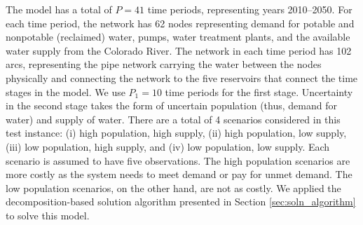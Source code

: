 \documentclass[11pt]{article}
\newcommand{\x}{\mathbf{x}}
\newcommand{\y}{\mathbf{y}}
\renewcommand{\c}{\mathbf{c}}
\newcommand{\q}{\mathbf{q}}
\renewcommand{\b}{\mathbf{b}}
\renewcommand{\d}{\mathbf{d}}
\newcommand{\plp}{$\phi$LP-2}
\begin{document}


The model has a total of $P = 41$ time periods, representing years 2010--2050. 
For each time period, the network has 62 nodes representing demand for potable and nonpotable (reclaimed) water, pumps, water treatment plants, and the available water supply from the Colorado River.
The network in each time period has 102 arcs, representing the pipe network carrying the water between the nodes physically and connecting the network to the five reservoirs that connect the time stages in the model.
We use $P_1 = 10$ time periods for the first stage.
Uncertainty in the second stage takes the form of uncertain population (thus, demand for water) and supply of water.
There are a total of 4 scenarios considered in this test instance: (i) high population, high supply, (ii) high population, low supply, (iii) low population, high supply, and (iv) low population, low supply.
Each scenario is assumed to have five observations.
The high population scenarios are more costly as the system needs to meet demand or pay for unmet demand.
The low population scenarios, on the other hand, are not as costly. 
We applied the decomposition-based solution algorithm presented in Section \ref{sec:soln_algorithm} to solve this model.%
\end{document}
